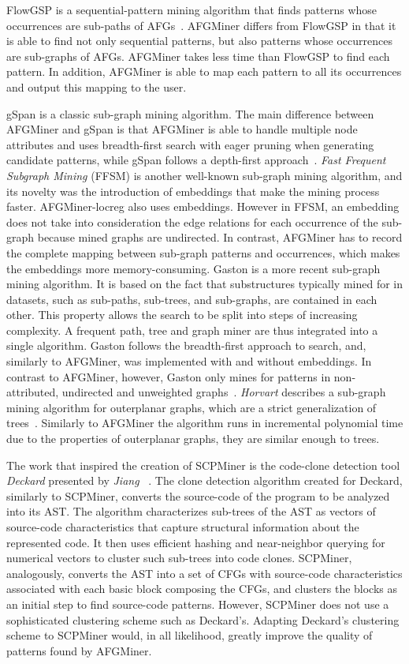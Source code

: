 FlowGSP is a sequential-pattern mining algorithm that finds patterns whose occurrences are sub-paths of AFGs~\cite{JockschCC10, FlowGSP}. AFGMiner differs from FlowGSP in that it is able to find not only sequential patterns, but also patterns whose occurrences are sub-graphs of AFGs. AFGMiner takes less time than FlowGSP to find each pattern. In addition, AFGMiner is able to map each pattern to all its occurrences and output this mapping to the user.

gSpan is a classic sub-graph mining algorithm. The main difference between AFGMiner and gSpan is that AFGMiner is able to handle multiple node attributes and uses breadth-first search with eager pruning when generating candidate patterns, while gSpan follows a depth-first approach~\cite{gSpan}. \emph{Fast Frequent Subgraph Mining} (FFSM) is another well-known sub-graph mining algorithm, and its novelty was the introduction of embeddings that make the mining process faster. AFGMiner-locreg also uses embeddings. However in FFSM, an embedding does not take into consideration the edge relations for each occurrence of the sub-graph because mined graphs are undirected. In contrast, AFGMiner has to record the complete mapping between sub-graph patterns and occurrences, which makes the embeddings more memory-consuming. Gaston is a more recent sub-graph mining algorithm. It is based on the fact that substructures typically mined for in datasets, such as sub-paths, sub-trees, and sub-graphs, are contained in each other. This property allows the search to be split into steps of increasing complexity. A frequent path, tree and graph miner are thus integrated into a single algorithm. Gaston follows the breadth-first approach to search, and, similarly to AFGMiner, was implemented with and without embeddings. In contrast to AFGMiner, however, Gaston only mines for patterns in non-attributed, undirected and unweighted graphs~\cite{Gaston}. \emph{Horvart \etal} describes a sub-graph mining algorithm for outerplanar graphs, which are a strict generalization of trees~\cite{HorvathKDD06}. Similarly to AFGMiner the algorithm runs in incremental polynomial time due to the properties of outerplanar graphs, \ie they are similar enough to trees.

The work that inspired the creation of SCPMiner is the code-clone detection tool \emph{Deckard} presented by \emph{Jiang \etal}~\cite{Deckard}. The clone detection algorithm created for Deckard, similarly to SCPMiner, converts the source-code of the program to be analyzed into its AST. The algorithm characterizes sub-trees of the AST as vectors of source-code characteristics that capture structural information about the represented code. It then uses efficient hashing and near-neighbor querying for numerical vectors to cluster such sub-trees into code clones. SCPMiner, analogously, converts the AST into a set of CFGs with source-code characteristics associated with each basic block composing the CFGs, and clusters the blocks as an initial step to find source-code patterns. However, SCPMiner does not use a sophisticated clustering scheme such as Deckard's. Adapting Deckard's clustering scheme to SCPMiner would, in all likelihood, greatly improve the quality of patterns found by AFGMiner.


